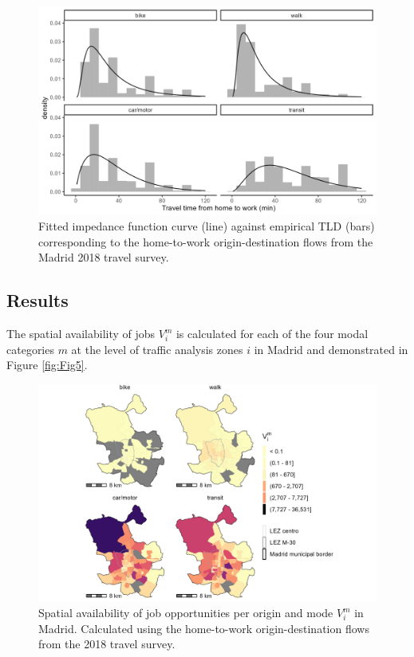 \documentclass[10pt,letterpaper]{article}
\begin{document}
\begin{figure}

{\centering \includegraphics[width=1\linewidth]{images/tlds_curves_m_plot} 

}

\caption{\label{fig:Fig4} Fitted impedance function curve (line) against empirical TLD (bars) corresponding to the home-to-work origin-destination flows from the Madrid 2018 travel survey.}\label{fig:tlds-curves-m-plot}
\end{figure}

\hypertarget{results}{%
\subsection{Results}\label{results}}

The spatial availability of jobs \(V_i^m\) is calculated for each of the
four modal categories \(m\) at the level of traffic analysis zones \(i\)
in Madrid and demonstrated in Figure \ref{fig:Fig5}.

\begin{figure}

{\centering \includegraphics[width=1\linewidth]{images/SA_im_V_zn208_plot} 

}

\caption{\label{fig:Fig5} Spatial availability of job opportunities per origin and mode $V_i^m$ in Madrid. Calculated using the home-to-work origin-destination flows from the 2018 travel survey. }\label{fig:SA-m-plot}
\end{figure}
\end{document}
